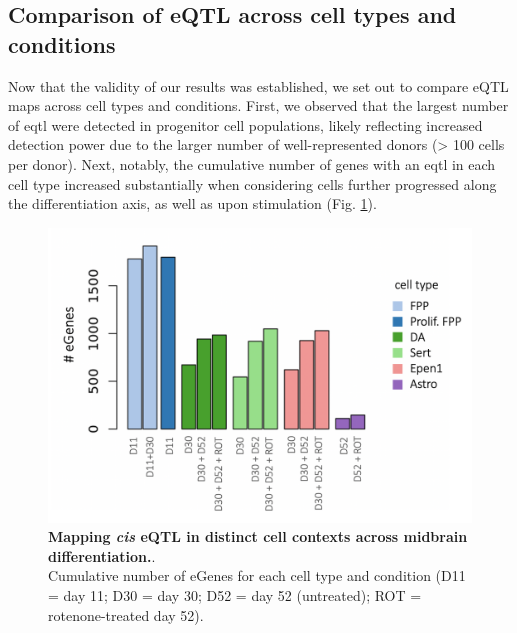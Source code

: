 

\clearpage

\subsection{Comparison of eQTL across cell types and conditions}

Now that the validity of our results was established, we set out to compare eQTL maps across cell types and conditions.
First, we observed that the largest number of \gls{eqtl} were detected in progenitor cell populations, likely reflecting increased detection power due to the larger number of well-represented donors (> 100 cells per donor). 
Next, notably, the cumulative number of genes with an \gls{eqtl} in each cell type increased substantially when considering cells further progressed along the differentiation axis, as well as upon stimulation (Fig. \ref{fig:neuroseq_eqtl}). 


\begin{figure}[h]
\centering
\includegraphics[width=15cm]{Chapter5/Fig/neuroseq_eqtl_cumulative.png}
\caption[Mapping eQTL across neuronal cell types]{\textbf{Mapping \textit{cis} eQTL in distinct cell contexts across midbrain differentiation.}.\\
Cumulative number of eGenes for each cell type and condition (D11 = day 11; D30 = day 30; D52 = day 52 (untreated); ROT = rotenone-treated day 52).}
\label{fig:neuroseq_eqtl}
\end{figure}


